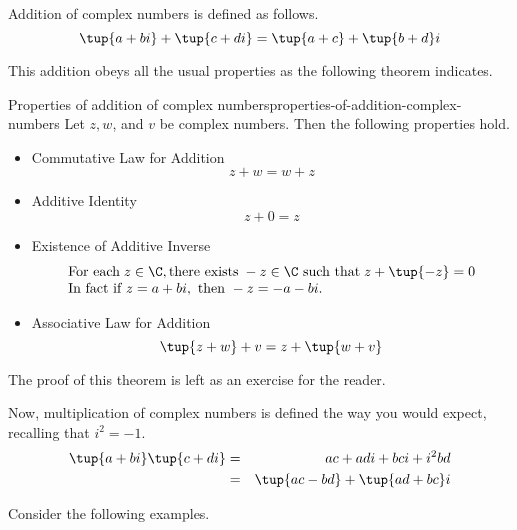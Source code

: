 Addition of complex numbers is defined as follows.
\begin{equation*}
\tup{a+bi} +\tup{c+di} =\tup{a+c} +\tup{b+d}i
\end{equation*}

This addition obeys all the usual properties as the following theorem indicates.

\begin{theorem}{Properties of addition of complex numbers}{properties-of-addition-complex-numbers}
Let $z,w$, and $v$ be complex numbers. Then the following properties hold.
\begin{itemize}
\item Commutative Law for Addition
\begin{equation*}
z+w=w+z
\end{equation*}

\item Additive Identity
\begin{equation*}
z+0=z
\end{equation*}

\item Existence of Additive Inverse
\begin{equation*}
\begin{array}{l}
\mbox{For each} \; z\in \C, \mbox{there exists}\; -z\in \C \mbox{ such that}\; 
z+\tup{-z} =0 \\
\mbox{In fact if } z=a+bi, \mbox{ then } -z=-a-bi.
\end{array}
\end{equation*}

\item Associative Law for Addition
\begin{equation*}
\tup{z+w} +v= z +\tup{w+v}
\end{equation*}
\end{itemize}
\end{theorem}

The proof of this theorem is left as an exercise for the reader.

Now, multiplication of complex numbers is defined the way you would expect, recalling that $i^{2} = -1$.
\begin{eqnarray*}
\tup{a+bi} \tup{c+di} &=&ac+adi+bci+i^{2}bd \\
&=&\tup{ac-bd} +\tup{ad + bc }i 
\end{eqnarray*}

Consider the following examples.

